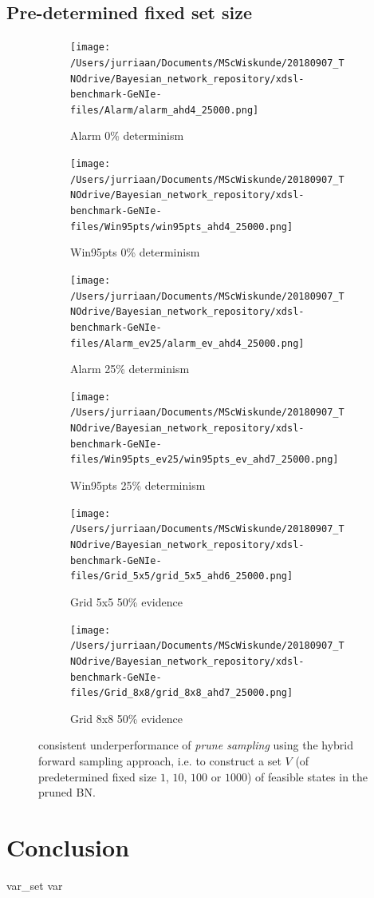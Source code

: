 \documentclass[a4paper, twoside, 11pt]{report}
\theoremstyle{plain}
\theoremstyle{definition}
\theoremstyle{remark}
\newcommand{\ps}{\textit{prune sampling }}
\begin{document}
\section{Pre-determined fixed set size}
\begin{figure}[h!]
\centering

\begin{subfigure}{.5\linewidth}
\texttt{[image: /Users/jurriaan/Documents/MScWiskunde/20180907\_TNOdrive/Bayesian\_network\_repository/xdsl-benchmark-GeNIe-files/Alarm/alarm\_ahd4\_25000.png]}
\caption{Alarm 0\% determinism}%
\label{alarm_ev}%
\end{subfigure}\hfill%
\begin{subfigure}{.5\linewidth}
\texttt{[image: /Users/jurriaan/Documents/MScWiskunde/20180907\_TNOdrive/Bayesian\_network\_repository/xdsl-benchmark-GeNIe-files/Win95pts/win95pts\_ahd4\_25000.png]}
\caption{Win95pts 0\% determinism}%
\label{win95pts_ev}%
\end{subfigure}

\begin{subfigure}{.5\linewidth}
\texttt{[image: /Users/jurriaan/Documents/MScWiskunde/20180907\_TNOdrive/Bayesian\_network\_repository/xdsl-benchmark-GeNIe-files/Alarm\_ev25/alarm\_ev\_ahd4\_25000.png]}
\caption{Alarm 25\% determinism}%
\label{grid_3x3}%
\end{subfigure}\hfill%
\begin{subfigure}{.5\linewidth}
\texttt{[image: /Users/jurriaan/Documents/MScWiskunde/20180907\_TNOdrive/Bayesian\_network\_repository/xdsl-benchmark-GeNIe-files/Win95pts\_ev25/win95pts\_ev\_ahd7\_25000.png]}
\caption{Win95pts 25\% determinism}%
\label{grid_5x5}%
\end{subfigure}

\begin{subfigure}{.5\linewidth}
\texttt{[image: /Users/jurriaan/Documents/MScWiskunde/20180907\_TNOdrive/Bayesian\_network\_repository/xdsl-benchmark-GeNIe-files/Grid\_5x5/grid\_5x5\_ahd6\_25000.png]}
\caption{Grid 5x5 50\% evidence}%
\label{grid_3x3}%
\end{subfigure}\hfill%
\begin{subfigure}{.5\linewidth}
\texttt{[image: /Users/jurriaan/Documents/MScWiskunde/20180907\_TNOdrive/Bayesian\_network\_repository/xdsl-benchmark-GeNIe-files/Grid\_8x8/grid\_8x8\_ahd7\_25000.png]}
\caption{Grid 8x8 50\% evidence}%
\label{grid_5x5}%
\end{subfigure}

\vspace{0.75pc}
\caption{consistent underperformance of \ps using the hybrid forward sampling approach, i.e. to construct a set $V$ (of predetermined fixed size $1$, $10$, $100$ or $1000$) of feasible states in the pruned BN. }
\label{results1}
\end{figure}

\chapter{Conclusion}
\citep{lauritzen1988local}
\gls{var_set}
\gls{var}

\printglossaries



\end{document}
